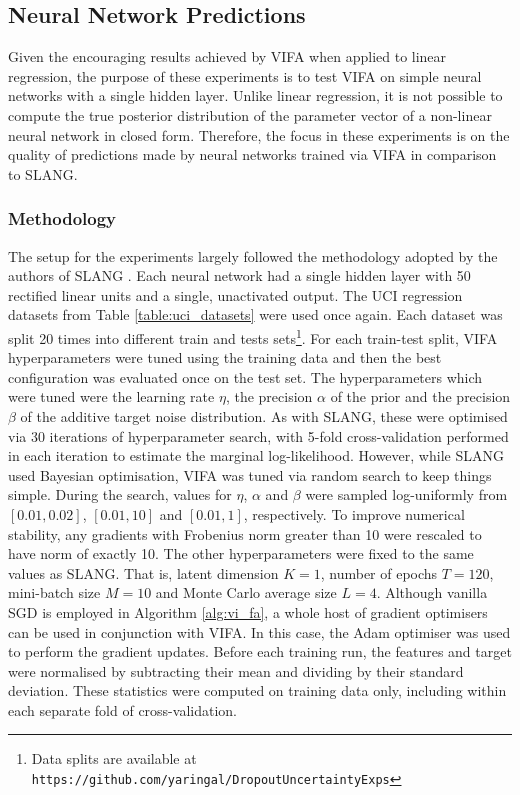 \documentclass[msc,deptreport.inf]{infthesis} %
\begin{document}
\subsection{Neural Network Predictions}

Given the encouraging results achieved by VIFA when applied to linear regression, the purpose of these experiments is to test VIFA on simple neural networks with a single hidden layer. Unlike linear regression, it is not possible to compute the true posterior distribution of the parameter vector of a non-linear neural network in closed form. Therefore, the focus in these experiments is on the quality of predictions made by neural networks trained via VIFA in comparison to SLANG. 

\subsubsection{Methodology}

The setup for the experiments largely followed the methodology adopted by the authors of SLANG \cite{mishkin2018}. Each neural network had a single hidden layer with 50 rectified linear units and a single, unactivated output. The UCI regression datasets from Table \ref{table:uci_datasets} were used once again. Each dataset was split 20 times into different train and tests sets\footnote{Data splits are available at \texttt{https://github.com/yaringal/DropoutUncertaintyExps}}. For each train-test split, VIFA hyperparameters were tuned using the training data and then the best configuration was evaluated once on the test set. The hyperparameters which were tuned were the learning rate $\eta$, the precision $\alpha$ of the prior and the precision $\beta$ of the additive target noise distribution. As with SLANG, these were optimised via 30 iterations of hyperparameter search, with 5-fold cross-validation performed in each iteration to estimate the marginal log-likelihood. However, while SLANG used Bayesian optimisation, VIFA was tuned via random search to keep things simple. During the search, values for $\eta$, $\alpha$ and $\beta$ were sampled log-uniformly from $[0.01, 0.02]$, $[0.01, 10]$ and $[0.01, 1]$, respectively. To improve numerical stability, any gradients with Frobenius norm greater than 10 were rescaled to have norm of exactly 10. The other hyperparameters were fixed to the same values as SLANG. That is, latent dimension $K=1$, number of epochs $T=120$, mini-batch size $M=10$ and Monte Carlo average size $L=4$. Although vanilla SGD is employed in Algorithm \ref{alg:vi_fa}, a whole host of gradient optimisers can be used in conjunction with VIFA. In this case, the Adam optimiser \cite{kingma2014} was used to perform the gradient updates. Before each training run, the features and target were normalised by subtracting their mean and dividing by their standard deviation. These statistics were computed on training data only, including within each separate fold of cross-validation.
\end{document}
